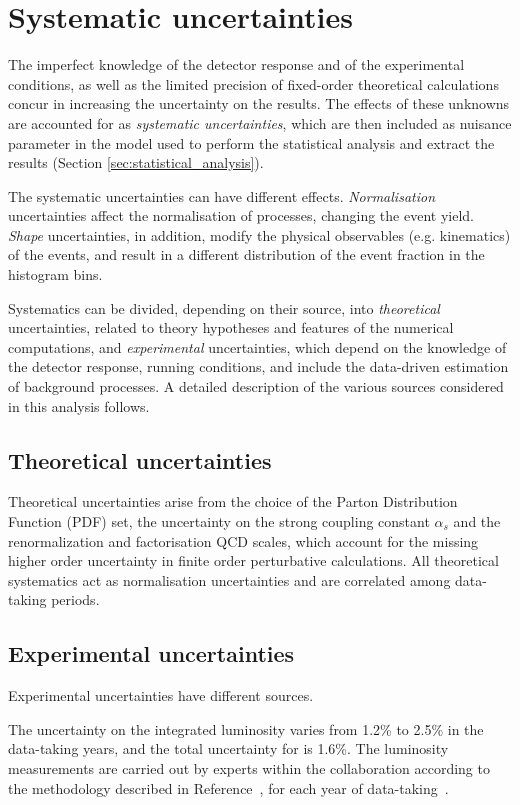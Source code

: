 \section{Systematic uncertainties}
\label{sec:systematics}
The imperfect knowledge of the detector response and of the experimental conditions, as well as the limited precision of fixed-order theoretical calculations concur in increasing the uncertainty on the results.
The effects of these unknowns are accounted for as \textit{systematic uncertainties}, which are then included as nuisance parameter in the model used to perform the statistical analysis and extract the results (Section \ref{sec:statistical_analysis}).

The systematic uncertainties can have different effects.
\textit{Normalisation} uncertainties affect the normalisation of processes, changing the event yield.
\textit{Shape} uncertainties, in addition, modify the physical observables (e.g. kinematics) of the events, and result in a different distribution of the event fraction in the histogram bins.

Systematics can be divided, depending on their source, into \textit{theoretical} uncertainties, related to theory hypotheses and features of the numerical computations, and \textit{experimental} uncertainties, which depend on the knowledge of the detector response, running conditions, and include the data-driven estimation of background processes.
A detailed description of the various sources considered in this analysis follows.

\subsection{Theoretical uncertainties}
Theoretical uncertainties arise from the choice of the Parton Distribution Function (PDF) set,
the uncertainty on the strong coupling constant $\alpha_s$ and
the renormalization and factorisation QCD scales, which account for the missing higher order uncertainty in finite order perturbative calculations.
All theoretical systematics act as normalisation uncertainties and are correlated among data-taking periods.

\subsection{Experimental uncertainties}
Experimental uncertainties have different sources.

The uncertainty on the integrated luminosity varies from 1.2\usep\% to 2.5\usep\% in the data-taking years, and the total uncertainty for \RunII{} is 1.6\usep\%.
The luminosity measurements are carried out by experts within the collaboration according to the methodology described in Reference~\cite{CMS:LUM-17-003},
for each year of data-taking~\cite{CMS:LUM-17-004, CMS:LUM-18-002}.

